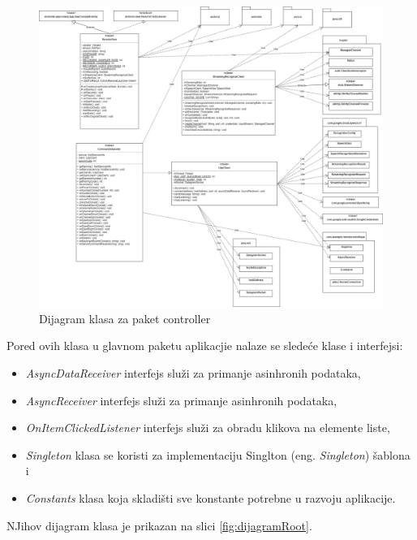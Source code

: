 \documentclass[implementacija.tex]{subfiles}
\begin{document}
\begin{figure}[!ht]
  \centering
  \includegraphics[width=\textwidth]{Implementacija/dijagrami/controller_package_class_diagram.jpg}
  \caption{Dijagram klasa za paket controller}
  \label{fig:dijagramController}
\end{figure}

Pored ovih klasa u glavnom paketu aplikacjie nalaze se sledeće klase i interfejsi:
\begin{itemize}
\item \textit{AsyncDataReceiver} interfejs služi za primanje asinhronih podataka,
\item \textit{AsyncReceiver} interfejs služi za primanje asinhronih podataka,
\item \textit{OnItemClickedListener} interfejs služi za obradu klikova na elemente liste,
\item \textit{Singleton} klasa se koristi za implementaciju Singlton (eng. \textit{Singleton}) šablona i
\item \textit{Constants} klasa koja skladišti sve konstante potrebne u razvoju aplikacije.
\end{itemize}
NJihov dijagram klasa je prikazan na slici \ref{fig:dijagramRoot}.
\end{document}
